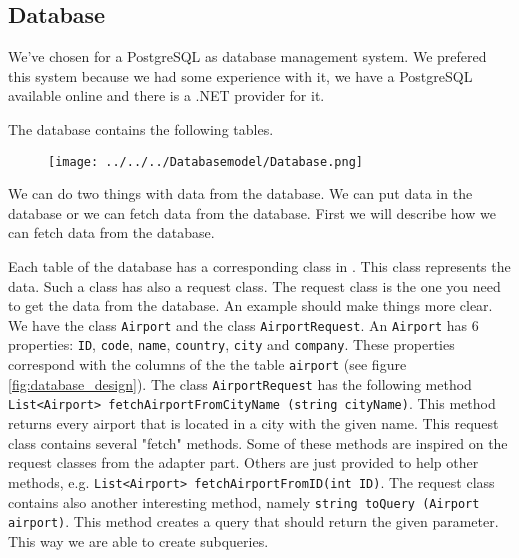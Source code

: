 
\subsection{Database}
We've chosen for a PostgreSQL as database management system. We prefered this system because we had some experience with it, we have a PostgreSQL available online and there is a .NET provider for it.

The database contains the following tables.
\begin{figure}
	\centering
	\texttt{[image: ../../../Databasemodel/Database.png]}
\end{figure}

We can do two things with data from the database. We can put data in the database or we can fetch data from the database. First we will describe how we can fetch data from the database.

Each table of the database has a corresponding class in \Csh. This class represents the  data. Such a class has also a request class. The request class is the one you need to get the data from the database. An example should make things more clear. We have the class \texttt{Airport} and the class \texttt{AirportRequest}. An \texttt{Airport} has 6 properties: \texttt{ID}, \texttt{code}, \texttt{name}, \texttt{country}, \texttt{city} and  \texttt{company}. These properties correspond with the columns of the the table \texttt{airport} (see figure \ref{fig:database_design}). The class \texttt{AirportRequest} has the following method \texttt{List<Airport> fetchAirportFromCityName (string cityName)}. This method returns every airport that is located in a city with the given name. This request class contains several "fetch" methods. Some of these methods are inspired on the request classes from the adapter part. Others are just provided to help other methods, e.g. \texttt{List<Airport> fetchAirportFromID(int ID)}. The request class contains also another interesting method, namely \texttt{string toQuery (Airport airport)}. This method creates a query that should return the given parameter. This way we are able to create subqueries.

